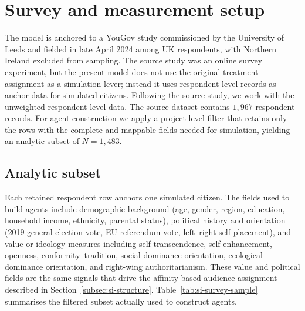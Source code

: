 \documentclass[pdflatex,sn-mathphys-num]{sn-jnl}%
\theoremstyle{thmstyleone}%
\theoremstyle{thmstyletwo}%
\theoremstyle{thmstylethree}%
\begin{document}
\section{Survey and measurement setup}\label{sec:si-survey}

The model is anchored to a YouGov study commissioned by the University of Leeds
and fielded in late April 2024 among UK respondents, with Northern Ireland
excluded from sampling. The source study was an online survey experiment, but the
present model does not use the original treatment assignment as a simulation
lever; instead it uses respondent-level records as anchor data for simulated
citizens. Following the source study, we work with the unweighted
respondent-level data. The source dataset contains $1{,}967$ respondent records.
For agent construction we apply a project-level filter that retains only the rows
with the complete and mappable fields needed for simulation, yielding an analytic
subset of $N=1{,}483$.

\subsection{Analytic subset}\label{subsec:si-analytic-subset}

Each retained respondent row anchors one simulated citizen. The fields used to
build agents include demographic background (age, gender, region, education,
household income, ethnicity, parental status), political history and orientation
(2019 general-election vote, EU referendum vote, left--right self-placement), and
value or ideology measures including self-transcendence, self-enhancement,
openness, conformity--tradition, social dominance orientation, ecological
dominance orientation, and right-wing authoritarianism. These value and political
fields are the same signals that drive the affinity-based audience assignment
described in Section~\ref{subsec:si-structure}.
Table~\ref{tab:si-survey-sample} summarises the filtered subset actually used to
construct agents.
\end{document}
